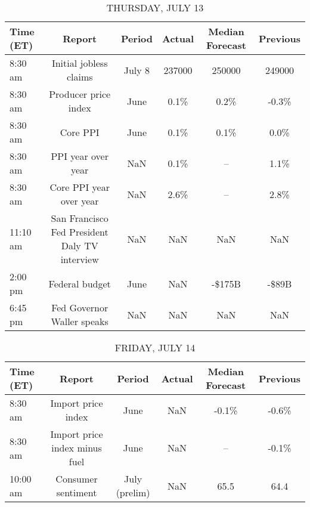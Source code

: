 \documentclass{article}%
\begin{document}
\begin{table}[htbp]%
\caption{THURSDAY, JULY 13}%
\centering%
\begin{adjustbox}{width=1\textwidth}%
\begin{tabular}{lccccc}
\toprule
Time (ET) &                                        Report & Period & Actual & Median Forecast & Previous \\
\midrule
  8:30 am &                        Initial jobless claims & July 8 & 237000 &          250000 &   249000 \\
  8:30 am &                          Producer price index &   June &   0.1\% &            0.2\% &    -0.3\% \\
  8:30 am &                                      Core PPI &   June &   0.1\% &            0.1\% &     0.0\% \\
  8:30 am &                            PPI year over year &    NaN &   0.1\% &              -- &     1.1\% \\
  8:30 am &                       Core PPI year over year &    NaN &   2.6\% &              -- &     2.8\% \\
 11:10 am & San Francisco Fed President Daly TV interview &    NaN &    NaN &             NaN &      NaN \\
  2:00 pm &                                Federal budget &   June &    NaN &          -\$175B &    -\$89B \\
  6:45 pm &                    Fed Governor Waller speaks &    NaN &    NaN &             NaN &      NaN \\
\bottomrule
\end{tabular}
%
\end{adjustbox}%
\end{table}

%


\begin{table}[htbp]%
\caption{FRIDAY, JULY 14}%
\centering%
\begin{adjustbox}{width=1\textwidth}%
\begin{tabular}{lccccc}
\toprule
Time (ET) &                        Report &        Period & Actual & Median Forecast & Previous \\
\midrule
  8:30 am &            Import price index &          June &    NaN &           -0.1\% &    -0.6\% \\
  8:30 am & Import price index minus fuel &          June &    NaN &              -- &    -0.1\% \\
 10:00 am &            Consumer sentiment & July (prelim) &    NaN &            65.5 &     64.4 \\
\bottomrule
\end{tabular}
%
\end{adjustbox}%
\end{table}
\end{document}
